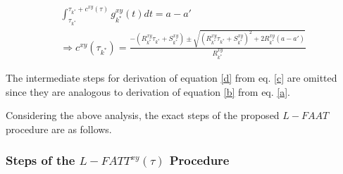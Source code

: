 \documentclass[conference]{IEEEtran}
\begin{document}
\begin{itemize}
\begin{eqnarray}
 &\int_{\tau_{k^*}}^{\tau_{k^*}+c^{xy}(\tau)}g_{k^*}^{xy}(t)dt=a-a'& \label{c}\\
 &\Rightarrow c^{xy}(\tau_{k^*})=\frac{-(R_{k^*}^{xy}\tau_{k^*}+S_{k^*}^{xy})\pm\sqrt{(R_{k^*}^{xy}\tau_{k^*}+S_{k^*}^{xy})^2+2R_{k^*}^{xy}(a-a')}}{R_{k^*}^{xy}}& \label{d}
\end{eqnarray}

The intermediate steps for derivation of equation \ref{d} from eq. \ref{c} are omitted since they are analogous to derivation of equation \ref{b} from eq. \ref{a}.    
\end{itemize}
    

Considering the above analysis, the exact steps of the proposed $L-FAAT$ procedure are as follows.

\subsubsection{Steps of the $L-FATT^{xy}(\tau)$ Procedure}
\end{document}
